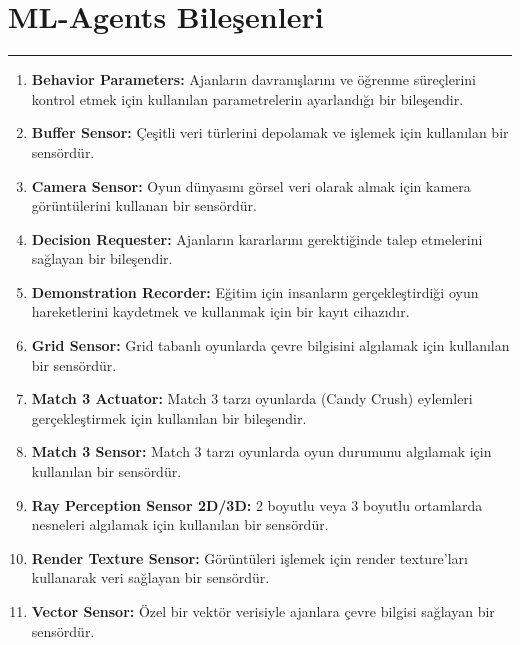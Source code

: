 \documentclass{article}
\begin{document}
\section{ML-Agents Bileşenleri}
\rule{\textwidth}{0.5pt}
\begin{enumerate}
    \item \textbf {Behavior Parameters:} Ajanların davranışlarını ve öğrenme süreçlerini kontrol etmek için kullanılan parametrelerin ayarlandığı bir bileşendir.
    \item \textbf {Buffer Sensor:} Çeşitli veri türlerini depolamak ve işlemek için kullanılan bir sensördür.
    \item \textbf {Camera Sensor:} Oyun dünyasını görsel veri olarak almak için kamera görüntülerini kullanan bir sensördür.
    \item \textbf {Decision Requester:} Ajanların kararlarını gerektiğinde talep etmelerini sağlayan bir bileşendir.
    \item \textbf {Demonstration Recorder:} Eğitim için insanların gerçekleştirdiği oyun hareketlerini kaydetmek ve kullanmak için bir kayıt cihazıdır.
    \item \textbf {Grid Sensor:} Grid tabanlı oyunlarda çevre bilgisini algılamak için kullanılan bir sensördür.
    \item \textbf {Match 3 Actuator:} Match 3 tarzı oyunlarda (Candy Crush) eylemleri gerçekleştirmek için kullanılan bir bileşendir.
    \item \textbf {Match 3 Sensor:} Match 3 tarzı oyunlarda oyun durumunu algılamak için kullanılan bir sensördür.
    \item \textbf {Ray Perception Sensor 2D/3D:} 2 boyutlu veya 3 boyutlu ortamlarda nesneleri algılamak için kullanılan bir sensördür.
    \item \textbf {Render Texture Sensor:} Görüntüleri işlemek için render texture'ları kullanarak veri sağlayan bir sensördür.
    \item \textbf {Vector Sensor:} Özel bir vektör verisiyle ajanlara çevre bilgisi sağlayan bir sensördür.\\[15pt]
\end{enumerate}
\end{document}
